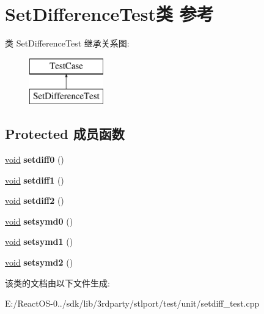 \hypertarget{class_set_difference_test}{}\section{Set\+Difference\+Test类 参考}
\label{class_set_difference_test}
类 Set\+Difference\+Test 继承关系图\+:\begin{figure}[H]
\begin{center}
\leavevmode
\includegraphics[height=2.000000cm]{class_set_difference_test}
\end{center}
\end{figure}
\subsection*{Protected 成员函数}
\begin{DoxyCompactItemize}
\item 
\mbox{\label{class_set_difference_test_a60391e07fa3dc149b9a645842326e689}} 
\hyperlink{interfacevoid}{void} {\bfseries setdiff0} ()
\item 
\mbox{\label{class_set_difference_test_a81af942309814da52c6dea6368b79cc0}} 
\hyperlink{interfacevoid}{void} {\bfseries setdiff1} ()
\item 
\mbox{\label{class_set_difference_test_ab6f22e350892d9ae7bb33a2d0d2e51ba}} 
\hyperlink{interfacevoid}{void} {\bfseries setdiff2} ()
\item 
\mbox{\label{class_set_difference_test_ac4e10362369c5a8409769a6455251fe8}} 
\hyperlink{interfacevoid}{void} {\bfseries setsymd0} ()
\item 
\mbox{\label{class_set_difference_test_a616d3abadfe3dfda6370fb4ebcf5b8c5}} 
\hyperlink{interfacevoid}{void} {\bfseries setsymd1} ()
\item 
\mbox{\label{class_set_difference_test_aee6d16afd7bb80835fa78474607a8511}} 
\hyperlink{interfacevoid}{void} {\bfseries setsymd2} ()
\end{DoxyCompactItemize}


该类的文档由以下文件生成\+:\begin{DoxyCompactItemize}
\item 
E\+:/\+React\+O\+S-\/0../sdk/lib/3rdparty/stlport/test/unit/setdiff\+\_\+test.\+cpp\end{DoxyCompactItemize}
